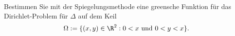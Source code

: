
\begin{exercise}

Bestimmen Sie mit der Spiegelungsmethode eine greensche Funktion für das
Dirichlet-Problem für $\Delta$ auf dem Keil
\begin{align*}
  \Omega := \{(x,y) \in \R^2: 0 < x \text{ und } 0 < y < x\}.
\end{align*}

\end{exercise}


\begin{solution}

\phantom{}

\end{solution}

